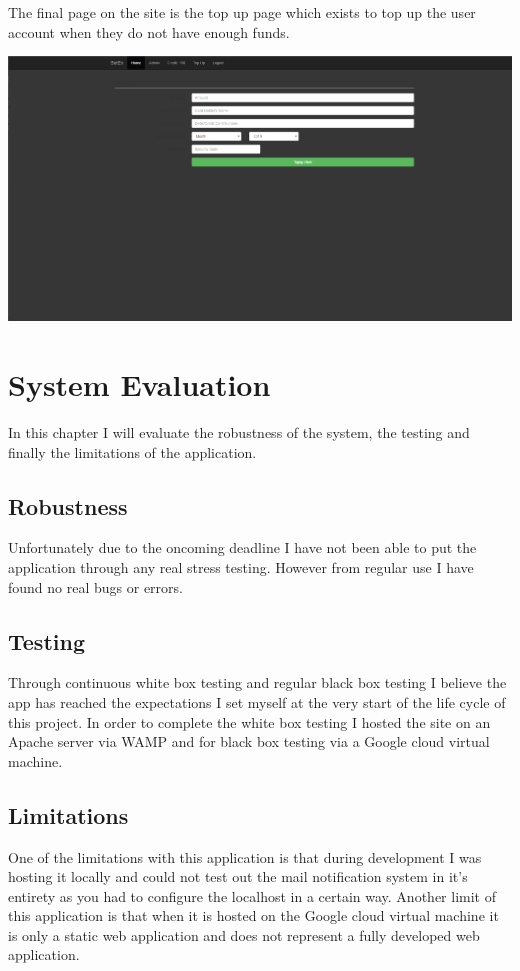 The final page on the site is the top up page which exists to top up the user account when they do not have enough funds.

\includegraphics[width=\textwidth,height=\textheight,keepaspectratio]{img/screenshots/topup.png}

\chapter{System Evaluation}
In this chapter I will evaluate the robustness of the system, the testing and finally the limitations of the application.

\section{Robustness}
Unfortunately due to the oncoming deadline I have not been able to put the application through any real stress testing. However from regular use I have found no real bugs or errors.

\section{Testing}
Through continuous white box testing and regular black box testing I believe the app has reached the expectations I set myself at the very start of the life cycle of this project. In order to complete the white box testing I hosted the site on an Apache server via WAMP and for black box testing via a Google cloud virtual machine.

\section{Limitations}
One of the limitations with this application is that during development I was hosting it locally and could not test out the mail notification system in it's entirety as you had to configure the localhost in a certain way. Another limit of this application is that when it is hosted on the Google cloud virtual machine it is only a static web application and does not represent a fully developed web application.


